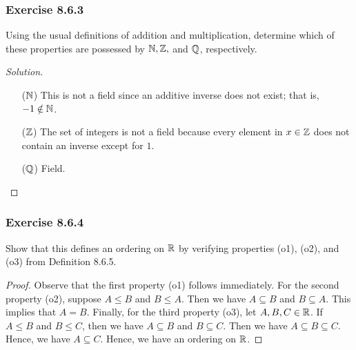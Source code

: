 \subsubsection{Exercise 8.6.3}  Using the usual definitions of addition and multiplication, determine which of these properties are possessed by \( \mathbb{N}  , \mathbb{Z},  \) and \( \mathbb{Q}  \), respectively.
\begin{proof}[Solution]
\begin{enumerate}
    \item[(\( \mathbb{N}  \))] This is not a field since an additive inverse does not exist; that is, \( - 1 \notin \mathbb{N} \). 
    \item[(\( \mathbb{Z}  \))] The set of integers is not a field because every element in \( x \in \mathbb{Z}  \) does not contain an inverse except for \(  1  \).
    \item[(\( \mathbb{Q} \))] Field.
\end{enumerate}
\end{proof}



\subsubsection{Exercise 8.6.4} Show that this defines an ordering on \( \mathbb{R}  \) by verifying properties (o1), (o2), and (o3) from Definition 8.6.5.
\begin{proof} 
    Observe that the first property (o1) follows immediately. For the second property (o2), suppose \( A \leq B  \) and \( B \leq A  \). Then we have \( A \subseteq B  \) and \( B \subseteq A  \). This implies that \( A = B  \). Finally, for the third property (o3), let \( A, B, C \in \mathbb{R}   \). If \( A \leq B  \) and \( B \leq C \), then we have \( A \subseteq B  \) and \( B \subseteq C  \). Then we have \( A \subseteq B \subseteq C  \). Hence, we have \( A \subseteq C \). Hence, we have an ordering on \( \mathbb{R}  \).
\end{proof}



